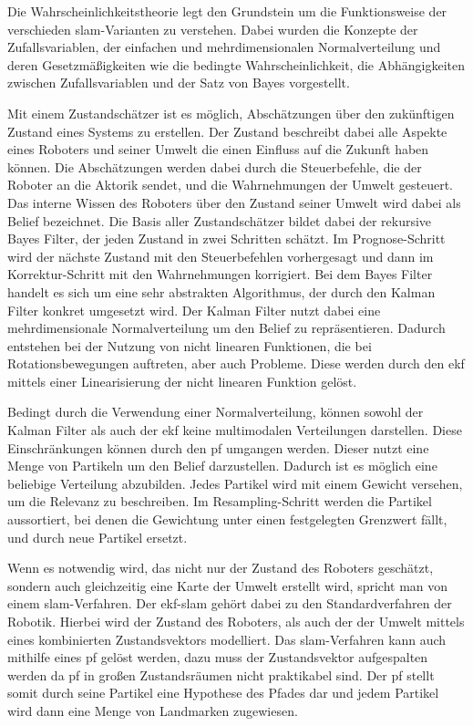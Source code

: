 Die Wahrscheinlichkeitstheorie legt den Grundstein um die Funktionsweise der verschieden \gls{slam}-Varianten zu verstehen. Dabei wurden die Konzepte der Zufallsvariablen, der einfachen und mehrdimensionalen Normalverteilung und deren Gesetzmäßigkeiten wie die bedingte Wahrscheinlichkeit, die Abhängigkeiten zwischen Zufallsvariablen und der Satz von Bayes vorgestellt.

Mit einem Zustandschätzer ist es möglich, Abschätzungen über den zukünftigen Zustand eines Systems zu erstellen. Der Zustand beschreibt dabei alle Aspekte eines Roboters und seiner Umwelt die einen Einfluss auf die Zukunft haben können. Die Abschätzungen werden dabei durch die Steuerbefehle, die der Roboter an die Aktorik sendet, und die Wahrnehmungen der Umwelt gesteuert. Das interne Wissen des Roboters über den Zustand seiner Umwelt wird dabei als Belief bezeichnet. Die Basis aller Zustandschätzer bildet dabei der rekursive Bayes Filter, der jeden Zustand in zwei Schritten schätzt. Im Prognose-Schritt wird der nächste Zustand mit den Steuerbefehlen vorhergesagt und dann im Korrektur-Schritt mit den Wahrnehmungen korrigiert. Bei dem Bayes Filter handelt es sich um eine sehr abstrakten Algorithmus, der durch den Kalman Filter konkret umgesetzt wird. Der Kalman Filter nutzt dabei eine mehrdimensionale Normalverteilung um den Belief zu repräsentieren. Dadurch entstehen bei der Nutzung von nicht linearen Funktionen, die bei Rotationsbewegungen auftreten, aber auch Probleme. Diese werden durch den \gls{ekf} mittels einer Linearisierung der nicht linearen Funktion gelöst.

Bedingt durch die Verwendung einer Normalverteilung, können sowohl der Kalman Filter als auch der \gls{ekf} keine multimodalen Verteilungen darstellen. Diese Einschränkungen können durch den \gls{pf} umgangen werden. Dieser nutzt eine Menge von Partikeln um den Belief darzustellen. Dadurch ist es möglich eine beliebige Verteilung abzubilden. Jedes Partikel wird mit einem Gewicht versehen, um die Relevanz zu beschreiben. Im Resampling-Schritt werden die Partikel aussortiert, bei denen die Gewichtung unter einen festgelegten Grenzwert fällt, und durch neue Partikel ersetzt.

Wenn es notwendig wird, das nicht nur der Zustand des Roboters geschätzt, sondern auch gleichzeitig eine Karte der Umwelt erstellt wird, spricht man von einem \gls{slam}-Verfahren. Der \gls{ekf}-\gls{slam} gehört dabei zu den Standardverfahren der Robotik. Hierbei wird der Zustand des Roboters, als auch der der Umwelt mittels eines kombinierten Zustandsvektors modelliert. Das \gls{slam}-Verfahren kann auch mithilfe eines \gls{pf} gelöst werden, dazu muss der Zustandsvektor aufgespalten werden da \gls{pf} in großen Zustandsräumen nicht praktikabel sind. Der \gls{pf} stellt somit durch seine Partikel eine Hypothese des Pfades dar und jedem Partikel wird dann eine Menge von Landmarken zugewiesen.

